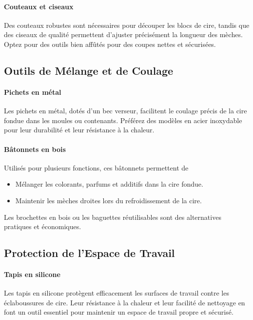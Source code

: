 \documentclass[11pt,fleqn,onecolumn,oneside]{book}
\begin{document}
\paragraph{Couteaux et ciseaux}
Des couteaux robustes sont nécessaires pour découper les blocs de cire, tandis que des ciseaux de qualité permettent d’ajuster précisément la longueur des mèches. Optez pour des outils bien affûtés pour des coupes nettes et sécurisées.

\subsection*{Outils de Mélange et de Coulage}

\paragraph{Pichets en métal}
Les pichets en métal, dotés d’un bec verseur, facilitent le coulage précis de la cire fondue dans les moules ou contenants. Préférez des modèles en acier inoxydable pour leur durabilité et leur résistance à la chaleur.

\paragraph{Bâtonnets en bois}
Utilisés pour plusieurs fonctions, ces bâtonnets permettent de
\begin{itemize}
    \item Mélanger les colorants, parfums et additifs dans la cire fondue.
    \item Maintenir les mèches droites lors du refroidissement de la cire.
\end{itemize}
Les brochettes en bois ou les baguettes réutilisables sont des alternatives pratiques et économiques.

\subsection*{Protection de l’Espace de Travail}

\paragraph{Tapis en silicone}
Les tapis en silicone protègent efficacement les surfaces de travail contre les éclaboussures de cire. Leur résistance à la chaleur et leur facilité de nettoyage en font un outil essentiel pour maintenir un espace de travail propre et sécurisé.
\end{document}

